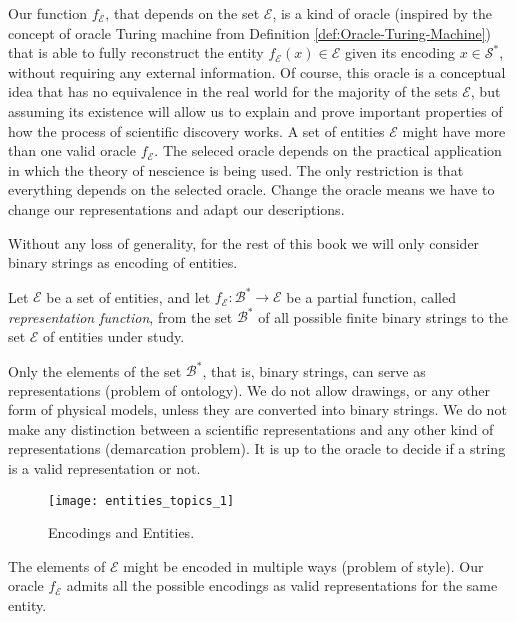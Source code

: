 Our function $f_\mathcal{E}$, that depends on the set $\mathcal{E}$, is a kind of oracle (inspired by the concept of oracle Turing machine from Definition \ref{def:Oracle-Turing-Machine}) that is able to fully reconstruct the entity $f_\mathcal{E} (x) \in \mathcal{E}$ given its encoding $x \in \mathcal{S}^\ast$, without requiring any external information. Of course, this oracle is a conceptual idea that has no equivalence in the real world for the majority of the sets $\mathcal{E}$, but assuming its existence will allow us to explain and prove important properties of how the process of scientific discovery works. A set of entities $\mathcal{E}$ might have more than one valid oracle $f_\mathcal{E}$. The seleced oracle depends on the practical application in which the theory of nescience is being used. The only restriction is that everything depends on the selected oracle. Change the oracle means we have to change our representations and adapt our descriptions.

Without any loss of generality, for the rest of this book we will only consider binary strings as encoding of entities.

\begin{definition}
\label{def:descriptions_topic}
Let $\mathcal{E}$ be a set of entities, and let $f_\mathcal{E}:\mathcal{B}^\ast \rightarrow \mathcal{E}$ be a partial function, called \emph{representation function}, from the set $\mathcal{B}^\ast$ of all possible finite binary strings to the set $\mathcal{E}$ of entities under study.
\end{definition}

Only the elements of the set $\mathcal{B}^\ast$, that is, binary strings, can serve as representations (problem of ontology). We do not allow drawings, or any other form of physical models, unless they are converted into binary strings. We do not make any distinction between a scientific representations and any other kind of representations (demarcation problem). It is up to the oracle to decide if a string is a valid representation or not.

\begin{figure}[h]
\centering\texttt{[image: entities\_topics\_1]}
\caption{\label{fig:entities_topics_1}Encodings and Entities.}
\end{figure}

The elements of $\mathcal{E}$ might be encoded in multiple ways (problem of style). Our oracle $f_\mathcal{E}$ admits all the possible encodings as valid representations for the same entity.

